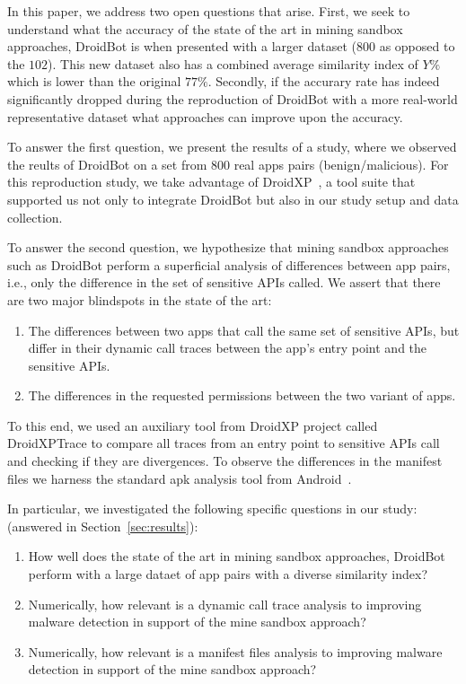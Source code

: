 In this paper, we address two open questions that arise. First, we seek to understand what the accuracy of the state of the art in mining sandbox approaches, DroidBot is when presented with a larger dataset ($800$ as opposed to the $102$). This new dataset also has a combined average similarity index of $Y\%$ which is lower than the original $77\%$. Secondly, if the accurary rate has indeed significantly dropped during the reproduction of DroidBot with a more real-world representative dataset what approaches can improve upon the accuracy. 

To answer the first question, we present the results of a study, where we observed the reults of DroidBot on a set from $800$ real apps pairs (benign/malicious). 
 For this reproduction study, we take advantage of DroidXP~\cite{DBLP:conf/scam/CostaMCMVBC20}, a tool suite that supported us not only to integrate DroidBot but also in our study setup and data collection.

To answer the second question, we hypothesize that mining sandbox approaches such as DroidBot perform a superficial analysis of differences between app pairs, i.e., only the difference in the set of sensitive APIs called. We assert that there are two major blindspots in the state of the art:
\begin{enumerate}
    \item The differences between two apps that call the same set of sensitive APIs, but differ in their dynamic call traces between the app's entry point and the sensitive APIs.
    \item The differences in the requested permissions between the two variant of apps.
\end{enumerate}

To this end, we used an auxiliary tool from DroidXP project called DroidXPTrace to compare all traces from an entry point to sensitive APIs call and checking if they are divergences. To observe the differences in the manifest files we harness the standard apk analysis tool from Android~\cite{au2011short}. 

In particular, we investigated the following specific questions in our study: (answered in Section~\ref{sec:results}):

\begin{enumerate}[(RQ1)]
 \item How well does the state of the art in mining sandbox approaches, DroidBot perform with a large dataet of app pairs with a diverse similarity index?
 \item Numerically, how relevant is a dynamic call trace analysis to improving malware detection in support of the mine sandbox approach?
 \item Numerically, how relevant is a manifest files analysis to improving malware detection in support of the mine sandbox approach?
\end{enumerate}
 


